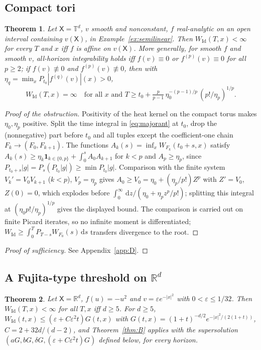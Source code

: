 \documentclass[11pt]{article}
\newtheorem{theorem}{Theorem}[section]
\theoremstyle{definition}
\theoremstyle{remark}
\newcommand{\R}{\mathbb{R}}
\newcommand{\X}{\mathsf{X}}
\newcommand{\T}{\mathbb{T}}
\newcommand{\Id}{\mathrm{Id}}
\newcommand{\dd}{\,\mathrm{d}}
\begin{document}
\subsection{Compact tori}

\begin{theorem}\label{thm:D}
Let $\X=\T^d$, $v$ smooth and nonconstant, $f$ real-analytic on an open
interval containing $v(\X)$, in Example~\ref{ex:semilinear}. Then
$W_\Id(T,x)<\infty$ for every $T$ and $x$ iff $f$ is affine on $v(\X)$.
More generally, for smooth $f$ and smooth $v$, all-horizon integrability
holds iff $f(v)\equiv0$ or $f^{(p)}(v)\equiv0$ for all $p\ge2$; if
$f(v)\not\equiv0$ and $f^{(p)}(v)\not\equiv0$, then with
$\eta_q=\min_xP_{t_0}|f^{(q)}(v)|(x)>0$,
\[
W_\Id(T,x)=\infty\quad\text{for all }x\text{ and }
T\ge t_0+\tfrac{p}{p-1}\,\eta_0^{-(p-1)/p}\,(p!/\eta_p)^{1/p}.
\]
\end{theorem}

\begin{proof}[Proof of the obstruction]
Positivity of the heat kernel on the compact torus makes $\eta_0,\eta_p$
positive. Split the time integral in \eqref{eq:majorant} at $t_0$, drop
the (nonnegative) part before $t_0$ and all tuples except the
coefficient-one chain $F_k\to(F_0,F_{k+1})$. The functions
$A_k(s)=\inf_xW_{F_k}(t_0+s,x)$ satisfy $A_k(s)\ge\eta_k\mathbf1_{k\in\{0,p\}}
+\int_0^sA_0A_{k+1}$ for $k<p$ and $A_p\ge\eta_p$, since
$P_{t_0+s}|g|=P_s(P_{t_0}|g|)\ge\min P_{t_0}|g|$. Comparison with the
finite system $V_k'=V_0V_{k+1}$ ($k<p$), $V_p=\eta_p$ gives
$A_0\ge V_0=\eta_0+(\eta_p/p!)Z^p$ with $Z'=V_0$, $Z(0)=0$, which
explodes before $\int_0^\infty\dd z/(\eta_0+\eta_pz^p/p!)$; splitting this
integral at $(\eta_0p!/\eta_p)^{1/p}$ gives the displayed bound. The
comparison is carried out on finite Picard iterates, so no infinite
moment is differentiated; $W_\Id\ge\int_0^T P_{T-s}W_{F_0}(s)\dd s$
transfers divergence to the root.
\end{proof}
\begin{proof}[Proof of sufficiency]
See Appendix~\ref{app:D}.
\end{proof}

\subsection{A Fujita-type threshold on $\R^d$}

\begin{theorem}\label{thm:E}
Let $\X=\R^d$, $f(u)=-u^2$ and $v=\varepsilon e^{-|x|^2}$ with
$0<\varepsilon\le1/32$. Then $W_\Id(T,x)<\infty$ for all $T,x$ iff
$d\ge5$. For $d\ge5$,
$W_\Id(t,x)\le(\varepsilon+C\varepsilon^2t)G(t,x)$ with
$G(t,x)=(1+t)^{-d/2}e^{-|x|^2/(2(1+t))}$, $C=2+32d/(d-2)$, and
Theorem~\ref{thm:B} applies with the supersolution
$(aG,bG,\delta G,(\varepsilon+C\varepsilon^2t)G)$ defined below, for every
horizon.
\end{theorem}
\end{document}
